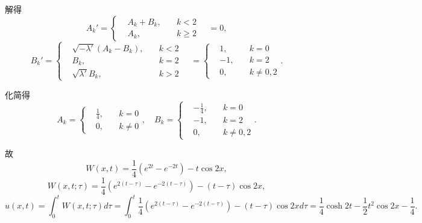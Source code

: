 \documentclass[11pt,a4paper]{article}
\begin{document}
解得
$$A_k'=\left\{\begin{aligned}&A_k+B_k,&\quad k<2\\&A_k,&\quad k\geqslant 2\end{aligned}\right.\quad=0,$$
$$B_k'=\left\{\begin{aligned}&\sqrt{-\lambda'}(A_k-B_k),&\quad k<2\\&B_k,&\quad k=2\\&\sqrt{\lambda'}B_k,&\quad k>2\end{aligned}\right.\quad=\left\{\begin{aligned}&1,&\quad k=0\\&-1,&\quad k=2\\&0,&\quad k\neq 0,2\end{aligned}\right..$$

化简得
$$A_k=\left\{\begin{aligned}&\frac{1}{4},&\quad k=0\\&0,&\quad k\neq 0\end{aligned}\right.,\quad
  B_k=\left\{\begin{aligned}&-\frac{1}{4},&\quad k=0\\&-1,&\quad k=2\\&0,&\quad k\neq0,2\end{aligned}\right..$$

故
$$W(x,t)=\frac{1}{4}(e^{2t}-e^{-2t})-t\cos2x,$$
$$W(x,t;\tau)=\frac{1}{4}(e^{2(t-\tau)}-e^{-2(t-\tau)})-(t-\tau)\cos2x,$$
$$u(x,t)=\int_0^tW(x,t;\tau)d\tau =\int_0^t\frac{1}{4}(e^{2(t-\tau)}-e^{-2(t-\tau)})-(t-\tau)\cos2xd\tau =\frac{1}{4}\cosh 2t-\frac{1}{2}t^2\cos 2x-\frac{1}{4}.$$
\end{document}
